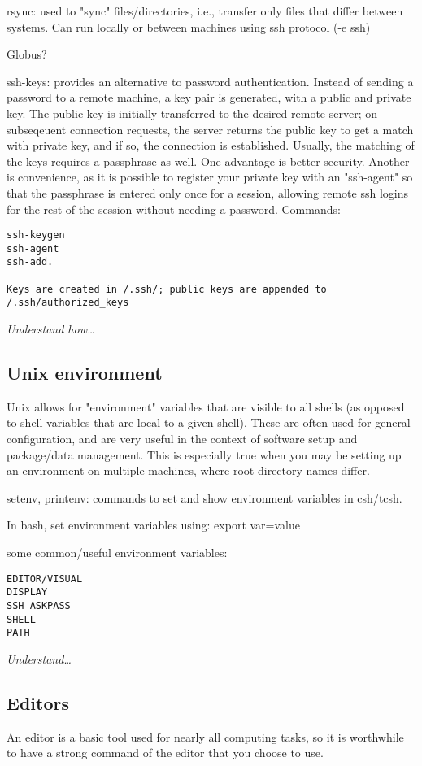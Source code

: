 \documentclass{article}
\newcommand{\test}[1]{%
    \begin{center}
        \colorbox{hl}{\parbox{0.9\textwidth}{\emph{#1}}}
    \end{center}}
\begin{document}
rsync: used to "sync" files/directories, i.e., transfer only files
that differ between systems. Can run locally or between machines using
ssh protocol (-e ssh)

Globus?

ssh-keys: provides an alternative to password authentication. Instead
of sending a password to a remote machine, a key pair is generated,
with a public and private key. The public key is initially transferred
to the desired remote server; on subseqeuent connection requests, the
server returns the public key to get a match with private key, and if
so, the connection is established. Usually, the matching of the keys
requires a passphrase as well. One advantage is better security.
Another is convenience, as it is possible to register your private key
with an "ssh-agent" so that the passphrase is entered only once for a
session, allowing remote ssh logins for the rest of the session
without needing a password. Commands:
\begin{verbatim}
ssh-keygen
ssh-agent
ssh-add.

Keys are created in /.ssh/; public keys are appended to /.ssh/authorized_keys
\end{verbatim}

\test{Understand how\ldots}

\subsection{Unix environment}

Unix allows for "environment" variables that are visible to all shells
(as opposed to shell variables that are local to a given shell). These
are often used for general configuration, and are very useful in the
context of software setup and package/data management. This is
especially true when you may be setting up an environment on multiple
machines, where root directory names differ.

setenv, printenv: commands to set and show environment variables in
csh/tcsh.

In bash, set environment variables using: export var=value

some common/useful environment variables:
\begin{verbatim}
EDITOR/VISUAL
DISPLAY
SSH_ASKPASS
SHELL
PATH
\end{verbatim}

\test{Understand\ldots}

\subsection{Editors}
An editor is a basic tool used for nearly all computing tasks, so it
is worthwhile to have a strong command of the editor that you choose
to use.
\end{document}

